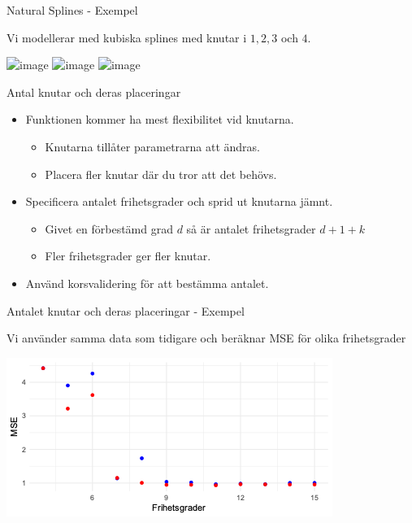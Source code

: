 \documentclass[10pt,english]{beamer}
\begin{document}
\begin{frame}{Natural Splines - Exempel}

    Vi modellerar med kubiska splines med knutar i $1,2,3$ och $4$.


    
    \includegraphics<1>[width=\textwidth]{figs/nonLinPeceBS.png}
    \includegraphics<2>[width=\textwidth]{figs/nonLinPeceBSNS.png}
    \includegraphics<3>[width=\textwidth]{figs/nonLinPeceBSNS2.png}

\end{frame}

\begin{frame}{Antal knutar och deras placeringar}
    
\begin{itemize}
    \item Funktionen kommer ha mest flexibilitet vid knutarna.
    \begin{itemize}
        \item Knutarna tillåter parametrarna att ändras.
        \item Placera fler knutar där du tror att det behövs.
    \end{itemize}
    \item Specificera antalet frihetsgrader och sprid ut knutarna jämnt.
    \begin{itemize}
        \item Givet en förbestämd grad $d$ så är antalet frihetsgrader $d+1+k$
        \item Fler frihetsgrader ger fler knutar.
    \end{itemize}
    \item Använd korsvalidering för att bestämma antalet.
\end{itemize}

\end{frame}

\begin{frame}{Antalet knutar och deras placeringar - Exempel}

    Vi använder samma data som tidigare och beräknar MSE för olika frihetsgrader

    \includegraphics[width=\textwidth]{figs/bsnsMSE.png}
    

\end{frame}
\end{document}
